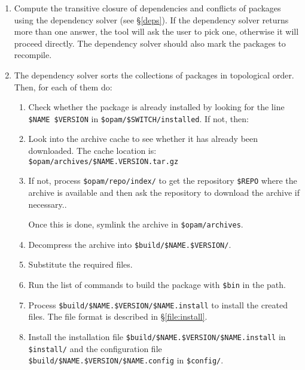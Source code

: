 \documentclass[a4paper,11pt]{article}
\begin{document}
\begin{enumerate}

\item Compute the transitive closure of dependencies and conflicts of
  packages using the dependency solver (see \S\ref{deps}). If the
  dependency solver returns more than one answer, the tool will ask
  the user to pick one, otherwise it will proceed directly. The
  dependency solver should also mark the packages to recompile.

\item The dependency solver sorts the collections of packages in
  topological order. Then, for each of them do:

\begin{enumerate}

\item Check whether the package is already installed by looking for
  the line \verb+$NAME $VERSION+ in \verb+$opam/$SWITCH/installed+.
  If not, then:

\item Look into the archive cache to see whether it has already been
  downloaded. The cache location is:
  \verb+$opam/archives/$NAME.VERSION.tar.gz+

\item If not, process \verb+$opam/repo/index/+ to get the repository
  \verb+$REPO+ where the archive is available and then ask the
  repository to download the archive if necessary..

  Once this is done, symlink the archive in \verb+$opam/archives+.

\item Decompress the archive into \verb+$build/$NAME.$VERSION/+.

\item Substitute the required files.

\item Run the list of commands to build the package with \verb+$bin+
  in the path.

\item Process \verb+$build/$NAME.$VERSION/$NAME.install+ to install
  the created files. The file format is described in \S\ref{file:install}.

\item Install the installation file
  \verb+$build/$NAME.$VERSION/$NAME.install+ in \verb+$install/+ and
  the configuration file \verb+$build/$NAME.$VERSION/$NAME.config+ in
  \verb+$config/+.

\end{enumerate}
\end{enumerate}
\end{document}
